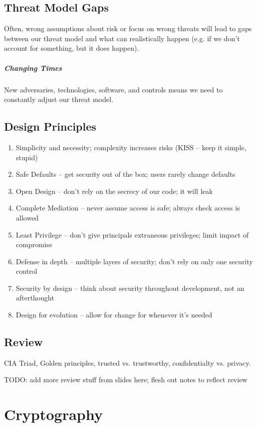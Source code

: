 \documentclass[code]{amznotes}
\begin{document}
\section{Threat Model Gaps}
Often, wrong assumptions about risk or focus on wrong threats will lead to gaps between our threat model and what can realistically happen (e.g. if we don't account for something, but it does happen).

\paragraph{Changing Times}
New adversaries, technologies, software, and controls means we need to constantly adjust our threat model.

\section{Design Principles}
\begin{enumerate}
    \item Simplicity and necessity; complexity increases risks (KISS -- keep it simple, stupid)
    \item Safe Defaults -- get security out of the box; users rarely change defaults
    \item Open Design -- don't rely on the secrecy of our code; it will leak
    \item Complete Mediation -- never assume access is safe; always check access is allowed
    \item Least Privilege -- don't give principals extraneous privileges; limit impact of compromise
    \item Defense in depth -- multiple layers of security; don't rely on only one security control
    \item Security by design -- think about security throughout development, not an afterthought
    \item Design for evolution -- allow for change for whenever it's needed
\end{enumerate}

\section{Review}
CIA Triad, Golden principles, trusted vs. trustworthy, confidentialty vs. privacy.

TODO: add more review stuff from slides here; flesh out notes to reflect review

\chapter{Cryptography}
\end{document}
